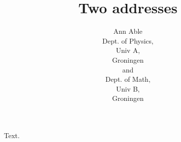 \documentclass{article}
\title{Two addresses}
\author{Ann Able\\
Dept. of Physics,\\
Univ A,\\
Groningen\\
and\\
Dept. of Math,\\
Univ B,\\
Groningen}
\begin{document}
\maketitle
Text.
\end{document}

